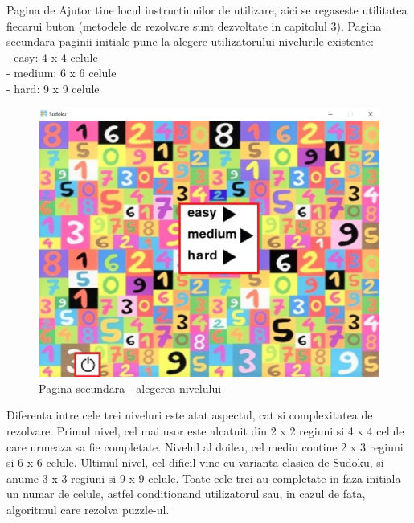 \documentclass[a4paper,18pt]{article}
\begin{document}
Pagina de Ajutor tine locul instructiunilor de utilizare, aici se regaseste utilitatea fiecarui buton (metodele de rezolvare sunt dezvoltate in capitolul 3). Pagina secundara paginii initiale pune la alegere utilizatorului nivelurile existente: 
\newline 
\\ \indent - easy: 4 x 4 celule
\newline 
\\ \indent - medium: 6 x 6 celule
\newline 
\\ \indent - hard: 9 x 9 celule

\newpage
\begin{figure}[h!]
\begin{center}
  \includegraphics[width=0.8\linewidth]{3.jpg}
  \caption{Pagina secundara - alegerea nivelului}
  \label{fig:3rd}
\end{center}
\end{figure}

Diferenta intre cele trei niveluri este atat aspectul, cat si complexitatea de rezolvare. Primul nivel, cel mai usor este alcatuit din 2 x 2 regiuni si 4 x 4 celule care urmeaza sa fie completate. Nivelul al doilea, cel mediu contine 2 x 3 regiuni si 6 x 6 celule. Ultimul nivel, cel dificil vine cu varianta clasica de Sudoku, si anume 3 x 3 regiuni si 9 x 9 celule. Toate cele trei au completate in faza initiala un numar de celule, astfel conditionand utilizatorul sau, in cazul de fata, algoritmul care rezolva puzzle-ul.
\end{document}
